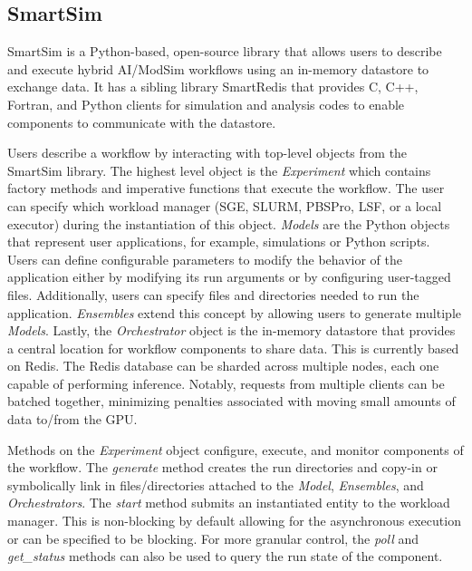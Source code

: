 \documentclass[utf8]{FrontiersinVancouver} %
\begin{document}
\subsection{SmartSim}
\label{sec:smartsim}

SmartSim is a Python-based, open-source library that allows users to describe and execute hybrid AI/ModSim workflows using an in-memory datastore to exchange data. It has a sibling library SmartRedis that provides C, C++, Fortran, and  Python clients for simulation and analysis codes to enable components to communicate with the datastore.

Users describe a workflow by interacting with top-level objects from the
SmartSim library. The highest level object is the {\em Experiment} which contains factory methods and imperative functions that execute the workflow. The user can
specify which workload manager (SGE, SLURM, PBSPro, LSF, or a local executor) during the instantiation of this object. {\em Models} are the Python objects that represent user applications, for example, simulations or Python scripts. Users can define configurable parameters to modify the behavior of the application either by modifying its run arguments or by configuring user-tagged files. Additionally, users can specify files and directories needed to run the application. {\em Ensembles} extend this concept by allowing users to generate multiple {\em Models}. Lastly, the {\em Orchestrator} object is the in-memory datastore that provides a central location for workflow components to share data. This is currently based on Redis. The Redis database can be sharded across multiple nodes, each one capable of performing inference. Notably, requests from multiple clients can be batched together, minimizing penalties associated with
moving small amounts of data to/from the GPU.

Methods on the {\em Experiment} object configure, execute, and monitor components of the workflow. The {\em generate} method creates the run directories and copy-in or symbolically link in files/directories attached to the {\em Model},  {\em Ensembles}, and {\em Orchestrators}. The {\em start} method submits an instantiated entity to the workload manager. This is non-blocking by default allowing for the asynchronous execution or can be specified to be blocking. For more granular control, the {\em poll} and {\em get\_status} methods can also be used to query the run state of the component.
\end{document}
